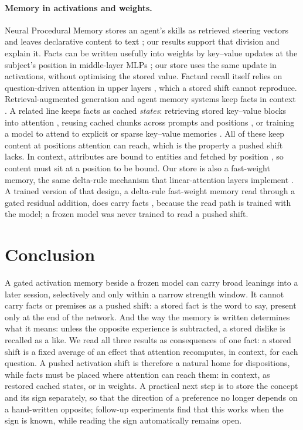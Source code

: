 \documentclass[11pt]{article}
\begin{document}
\paragraph{Memory in activations and weights.} Neural Procedural Memory stores an agent's skills as retrieved steering vectors and leaves declarative content to text \citep{zhao2026npm}; our results support that division and explain it. Facts can be written usefully into weights by key--value updates at the subject's position in middle-layer MLPs \citep{meng2022rome,meng2023memit}; our store uses the same update in activations, without optimising the stored value. Factual recall itself relies on question-driven attention in upper layers \citep{geva2023dissecting}, which a stored shift cannot reproduce. Retrieval-augmented generation and agent memory systems keep facts in context \citep{lewis2020rag,packer2023memgpt}. A related line keeps facts as cached \emph{states}: retrieving stored key--value blocks into attention \citep{xiao2024infllm,fountas2025emllm}, reusing cached chunks across prompts and positions \citep{gim2024promptcache,yao2025cacheblend,hu2025epic}, or training a model to attend to explicit or sparse key--value memories \citep{yang2024memory3,wang2025kblam}. All of these keep content at positions attention can reach, which is the property a pushed shift lacks. In context, attributes are bound to entities and fetched by position \citep{feng2024binding,prakash2024entity,prakash2026lookbacks}, so content must sit at a position to be bound. Our store is also a fast-weight memory, the same delta-rule mechanism that linear-attention layers implement \citep{schlag2021linear}. A trained version of that design, a delta-rule fast-weight memory read through a gated residual addition, does carry facts \citep{zhao2026fwpkm}, because the read path is trained with the model; a frozen model was never trained to read a pushed shift.

\section{Conclusion}
\label{sec:conclusion}

A gated activation memory beside a frozen model can carry broad leanings into a later session, selectively and only within a narrow strength window. It cannot carry facts or premises as a pushed shift: a stored fact is the word to say, present only at the end of the network. And the way the memory is written determines what it means: unless the opposite experience is subtracted, a stored dislike is recalled as a like. We read all three results as consequences of one fact: a stored shift is a fixed average of an effect that attention recomputes, in context, for each question. A pushed activation shift is therefore a natural home for dispositions, while facts must be placed where attention can reach them: in context, as restored cached states, or in weights. A practical next step is to store the concept and its sign separately, so that the direction of a preference no longer depends on a hand-written opposite; follow-up experiments find that this works when the sign is known, while reading the sign automatically remains open.
\end{document}
